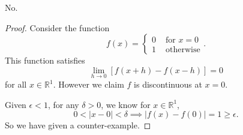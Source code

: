 \begin{Exercise}
	\begin{answer}
		No.
	\end{answer}
	\begin{proof}
		Consider the function
		$$
		f(x) = \begin{cases}
		0 & \mbox{ for } x=0 \\
		1 & \mbox{ otherwise}
		\end{cases}.
		$$
		This function satisfies
		$$
		\lim_{h\to 0}\left[f(x+h)-f(x-h)\right] = 0
		$$
		for all $x\in\mathbb{R}^1$. However we claim $f$ is discontinuous at $x=0$.
		
		Given $\epsilon < 1$, for any $\delta >0$, we know for $x\in\mathbb{R}^1$, 
		$$
		0<|x-0|<\delta \implies |f(x)-f(0)| = 1 \geq \epsilon.
		$$
		So we have given a counter-example.
	\end{proof}
\end{Exercise}